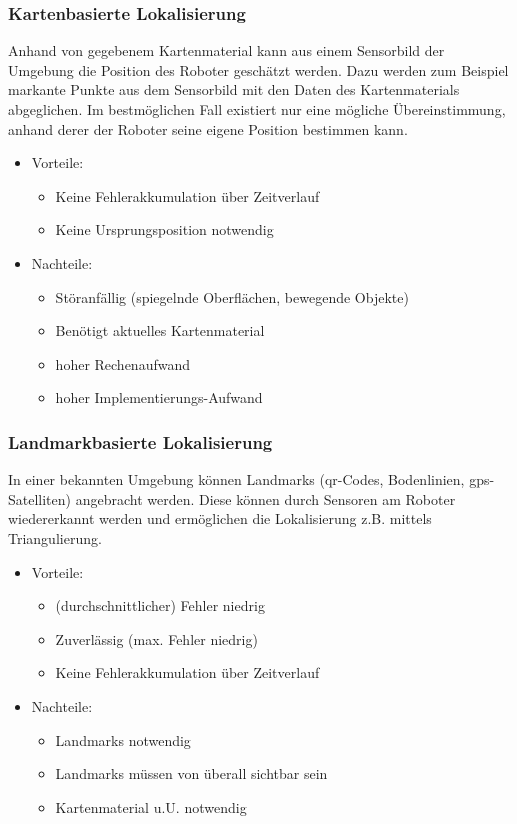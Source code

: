 \subsubsection{Kartenbasierte Lokalisierung}

Anhand von gegebenem Kartenmaterial kann aus einem Sensorbild
 der Umgebung die Position des Roboter geschätzt werden.
 Dazu werden zum Beispiel markante Punkte aus dem Sensorbild mit den
 Daten des Kartenmaterials abgeglichen. Im bestmöglichen Fall
 existiert nur eine mögliche Übereinstimmung, anhand derer der
 Roboter seine eigene Position bestimmen kann.

\begin{itemize}
  \item Vorteile:
  \begin{itemize}
    \item Keine Fehlerakkumulation über Zeitverlauf
    \item Keine Ursprungsposition notwendig
  \end{itemize}
  \item Nachteile:
  \begin{itemize}
    \item Störanfällig (spiegelnde Oberflächen, bewegende Objekte)
    \item Benötigt aktuelles Kartenmaterial
    \item hoher Rechenaufwand
    \item hoher Implementierungs-Aufwand
   \end{itemize}
\end{itemize}

\subsubsection{Landmarkbasierte Lokalisierung}

In einer bekannten Umgebung können Landmarks (\gls{qr}-Codes, Bodenlinien,
 \gls{gps}-Satelliten) angebracht werden. Diese können durch Sensoren
 am Roboter wiedererkannt werden und ermöglichen die Lokalisierung
 z.B. mittels Triangulierung.

\begin{itemize}
  \item Vorteile:
  \begin{itemize}
    \item (durchschnittlicher) Fehler niedrig
    \item Zuverlässig (max. Fehler niedrig)
    \item Keine Fehlerakkumulation über Zeitverlauf
  \end{itemize}
  \item Nachteile:
  \begin{itemize}
    \item Landmarks notwendig
    \item Landmarks müssen von überall sichtbar sein
    \item Kartenmaterial u.U. notwendig
   \end{itemize}
\end{itemize}

